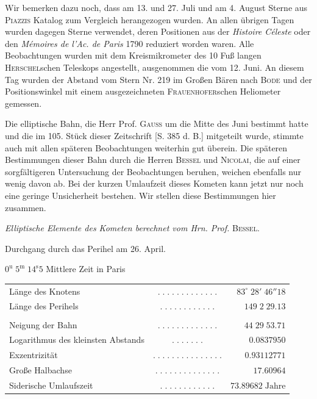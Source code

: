 \par\indent Wir bemerken dazu noch, dass am 13. und 27. Juli und am 4. August Sterne aus \textsc{Piazzis} Katalog zum Vergleich herangezogen wurden. An allen übrigen Tagen wurden dagegen Sterne verwendet, deren Positionen aus der \emph{Histoire Céleste} oder den \emph{Mémoires de l’Ac. de Paris} 1790 reduziert worden waren. Alle Beobachtungen wurden mit dem Kreismikrometer des 10 Fuß langen \textsc{Herschel}schen Teleskops angestellt, ausgenommen die vom 12. Juni. An diesem Tag wurden der Abstand vom Stern Nr. 219 im Großen Bären nach \textsc{Bode} und der Positionswinkel mit einem ausgezeichneten \textsc{Frauenhofer}schen Heliometer gemessen.

\par\indent Die elliptische Bahn, die Herr Prof. \textsc{Gauss} um die Mitte des Juni bestimmt hatte und die im 105. Stück dieser Zeitschrift [S. 385 d. B.] mitgeteilt wurde, stimmte auch mit allen späteren Beobachtungen weiterhin gut überein. Die späteren Bestimmungen dieser Bahn durch die Herren \textsc{Bessel} und \textsc{Nicolai}, die auf einer sorgfältigeren Untersuchung der Beobachtungen beruhen, weichen ebenfalls nur wenig davon ab. Bei der kurzen Umlaufzeit dieses Kometen kann jetzt nur noch eine geringe Unsicherheit bestehen. Wir stellen diese Bestimmungen hier zusammen.

\begin{center}
\emph{Elliptische Elemente des Kometen berechnet vom Hrn. Prof.} \textsc{Bessel.}
\end{center}

\begin{center}\fontsize{10}{12}\selectfont Durchgang durch das Perihel am 26. April.\par $0^{\mathrm u}\;5^{\mathrm m}\;14^{\mathrm s}5$ Mittlere Zeit in Paris\end{center}
\begin{center}\fontsize{9}{11}\selectfont\setlength{\tabcolsep}{2pt}\renewcommand{\arraystretch}{1.15}\begin{tabular}{lcr}
Länge des Knotens & $.\;.\;.\;.\;.\;.\;.\;.\;.\;.\;.\;.\;.$ & $83^\circ\;28'\;46''18$\\
Länge des Perihels & $.\;.\;.\;.\;.\;.\;.\;.\;.\;.\;.\;.$ & $149\;2\;29.13$\\
\\
Neigung der Bahn & $.\;.\;.\;.\;.\;.\;.\;.\;.\;.\;.\;.\;.$ & $44\;29\;53.71$\\
Logarithmus des kleinsten Abstands & $.\;.\;.\;.\;.\;.\;.$ & $0.0837950$\\
Exzentrizität & $.\;.\;.\;.\;.\;.\;.\;.\;.\;.\;.\;.\;.\;.\;.$ & $0.93112771$\\
Große Halbachse & $.\;.\;.\;.\;.\;.\;.\;.\;.\;.\;.\;.\;.\;.$ & $17.60964$\\
Siderische Umlaufszeit & $.\;.\;.\;.\;.\;.\;.\;.\;.\;.\;.\;.$ & $73.89682\;\text{Jahre}$\\
\end{tabular}\end{center}


